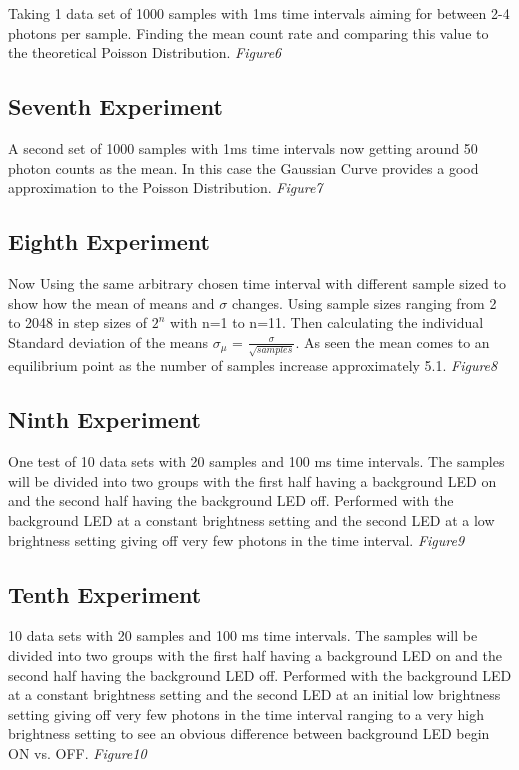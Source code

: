 \documentclass[12 pt,twoside]{article}
\begin{document}
Taking 1 data set of 1000 samples with 1ms time intervals aiming for between 2-4 photons per sample. Finding the mean count rate and comparing this value to the theoretical Poisson Distribution. {\it Figure6}

\subsection{Seventh Experiment}

A second set of 1000 samples with 1ms time intervals now getting around 50 photon counts as the mean. In this case the Gaussian Curve provides a good approximation to the Poisson Distribution. {\it Figure7}

\subsection{Eighth Experiment}

Now Using the same arbitrary chosen time interval with different sample sized to show how the mean of means and $\sigma$ changes. Using sample sizes ranging from 2 to 2048 in step sizes of $2^n$ with n=1 to n=11. Then calculating the individual Standard deviation of the means $\sigma_\mu$ = $\frac{\sigma}{\sqrt{samples}}$. As seen the mean comes to an equilibrium point as the number of samples increase approximately 5.1.  {\it Figure8} 

\subsection{Ninth Experiment}

One test of 10 data sets with 20 samples and 100 ms time intervals. The samples will be divided into two groups with the first half having a background LED on and the second half having the background LED off. Performed with the background LED at a constant brightness setting and the second LED at a low brightness setting giving off very few photons in the time interval. {\it Figure9}

\subsection{Tenth Experiment}

10 data sets with 20 samples and 100 ms time intervals. The samples will be divided into two groups with the first half having a background LED on and the second half having the background LED off. Performed with the background LED at a constant brightness setting and the second LED at an initial low brightness setting giving off very few photons in the time interval ranging to a very high brightness setting to see an obvious difference between background LED begin ON vs. OFF. {\it Figure10}
\end{document}
